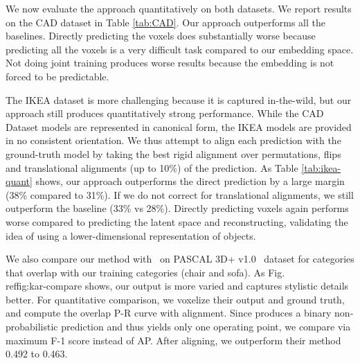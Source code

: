 \documentclass[runningheads]{llncs}
\newcommand{\etal}[0]{\textit{et al.\ }}
\begin{document}
We now evaluate the approach quantitatively on both datasets.
We report results 
on the CAD dataset in Table \ref{tab:CAD}. Our approach outperforms
all the baselines.
Directly predicting
the voxels does substantially worse because predicting all the voxels is
a very
difficult task compared to our embedding space. Not doing joint training
produces worse results because the embedding is not forced to be predictable.

The IKEA dataset is more challenging because it is captured in-the-wild, but
our approach still produces quantitatively strong performance.
While the CAD Dataset models are represented in canonical form, the 
IKEA models are provided in no consistent orientation. We thus attempt to align each prediction with the ground-truth model by 
taking the best rigid alignment over permutations, flips and translational alignments (up to 10\%) 
of the prediction.
As Table \ref{tab:ikea-quant} shows, our approach outperforms the direct prediction 
by a large margin (38\% compared to 31\%).
If we do not correct for translational alignments, we still outperform the baseline (33\% vs 28\%).
Directly predicting voxels again performs worse compared to predicting the latent space
and reconstructing, validating the idea of using a lower-dimensional representation of
objects.

\noindent{\bf Comparison with Kar \etal\cite{Kar15}:}
We also compare our method with~\cite{Kar15} on PASCAL 3D+
v1.0~\cite{xiang_wacv14} dataset for categories that overlap with our training categories (chair and sofa).
As Fig.\\ref{fig:kar-compare} shows, our output is more varied and captures stylistic details better.
For quantitative comparison, we voxelize their output and 
ground truth,
and compute the overlap P-R curve with alignment.
Since \cite{Kar15} produces a binary non-probabilistic prediction
and thus yields only one operating point, we compare via maximum F-1 score
instead of AP.
After aligning, we outperform
their method 0.492 to 0.463.
\end{document}
